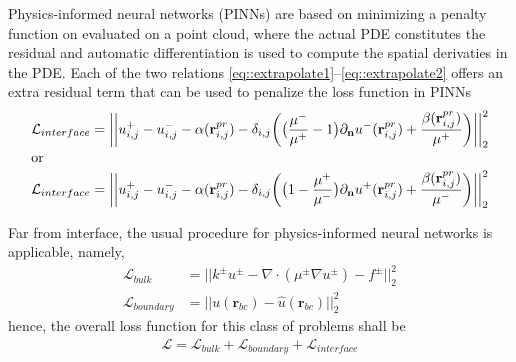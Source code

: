 \documentclass{elsarticle}
\begin{document}
Physics-informed neural networks (PINNs) are based on minimizing a penalty function on evaluated on a point cloud, where the actual PDE constitutes the residual and automatic differentiation is used to compute the spatial derivaties in the PDE. Each of the two relations \ref{eq::extrapolate1}--\ref{eq::extrapolate2} offers an extra residual term that can be used to penalize the loss function in PINNs
\begin{align}
\mathcal{L}_{interface} &= \bigg|\bigg| u^+_{i,j} - u^-_{i,j} - \alpha(\mathbf{r}_{i,j}^{pr}) - \delta_{i,j}\bigg(\big(\frac{\mu^-}{\mu^+}-1\big)\partial_\mathbf{n}u^-(\mathbf{r}^{pr}_{i,j}) + \frac{\beta(\mathbf{r}_{i,j}^{pr})}{\mu^+} \bigg) \bigg|\bigg|_2^2 \\
\intertext{or}
\mathcal{L}_{interface} &= \bigg|\bigg| u^+_{i,j} - u^-_{i,j} - \alpha(\mathbf{r}_{i,j}^{pr}) - \delta_{i,j}\bigg(\big(1-\frac{\mu^+}{\mu^-}\big)\partial_\mathbf{n}u^+(\mathbf{r}^{pr}_{i,j}) + \frac{\beta(\mathbf{r}_{i,j}^{pr})}{\mu^-} \bigg) \bigg|\bigg|_2^2
 \label{eq::interfaceLoss}
\end{align}


Far from interface, the usual procedure for physics-informed neural networks is applicable, namely,
\begin{align*}
\mathcal{L}_{bulk} &= \bigg|\bigg| k^{\pm}u^{\pm} - \nabla \cdot (\mu^{\pm}\nabla u^\pm) - f^{\pm} \bigg|\bigg|_2^2 \\
\mathcal{L}_{boundary} &= \bigg|\bigg|u(\mathbf{r}_{bc}) - \hat{u}(\mathbf{r}_{bc})\bigg|\bigg|_2^2
\end{align*}
hence, the overall loss function for this class of problems shall be
\begin{align*}
\mathcal{L} = \mathcal{L}_{bulk} + \mathcal{L}_{boundary} + \mathcal{L}_{interface}
\end{align*}
\end{document}

